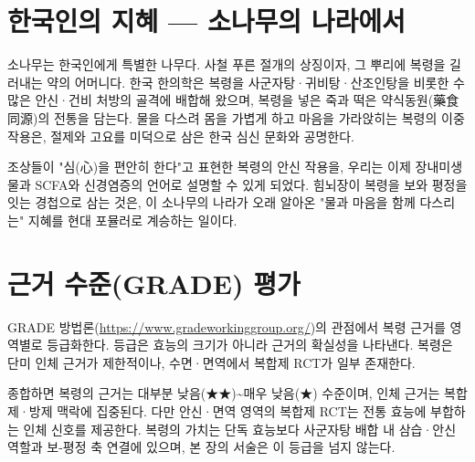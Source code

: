 \documentclass[12pt,oneside]{book}
\begin{document}
\section{한국인의 지혜 — 소나무의 나라에서}

소나무는 한국인에게 특별한 나무다. 사철 푸른 절개의 상징이자, 그 뿌리에 복령을 길러내는 약의 어머니다. 한국 한의학은 복령을 사군자탕·귀비탕·산조인탕을 비롯한 수많은 안신·건비 처방의 골격에 배합해 왔으며, 복령을 넣은 죽과 떡은 약식동원(藥食同源)의 전통을 담는다. 물을 다스려 몸을 가볍게 하고 마음을 가라앉히는 복령의 이중 작용은, 절제와 고요를 미덕으로 삼은 한국 심신 문화와 공명한다.

조상들이 "심(心)을 편안히 한다"고 표현한 복령의 안신 작용을, 우리는 이제 장내미생물과 SCFA와 신경염증의 언어로 설명할 수 있게 되었다. 힘뇌장이 복령을 보와 평정을 잇는 경첩으로 삼는 것은, 이 소나무의 나라가 오래 알아온 "물과 마음을 함께 다스리는" 지혜를 현대 포뮬러로 계승하는 일이다.

\section{근거 수준(GRADE) 평가}

GRADE 방법론(\url{https://www.gradeworkinggroup.org/})의 관점에서 복령 근거를 영역별로 등급화한다. 등급은 효능의 크기가 아니라 근거의 확실성을 나타낸다. 복령은 단미 인체 근거가 제한적이나, 수면·면역에서 복합제 RCT가 일부 존재한다.

\vspace{2pt}\vspace{3pt}

종합하면 복령의 근거는 대부분 낮음(★★)\textasciitilde{}매우 낮음(★) 수준이며, 인체 근거는 복합제·방제 맥락에 집중된다. 다만 안신·면역 영역의 복합제 RCT는 전통 효능에 부합하는 인체 신호를 제공한다. 복령의 가치는 단독 효능보다 사군자탕 배합 내 삼습·안신 역할과 보-평정 축 연결에 있으며, 본 장의 서술은 이 등급을 넘지 않는다.
\end{document}
